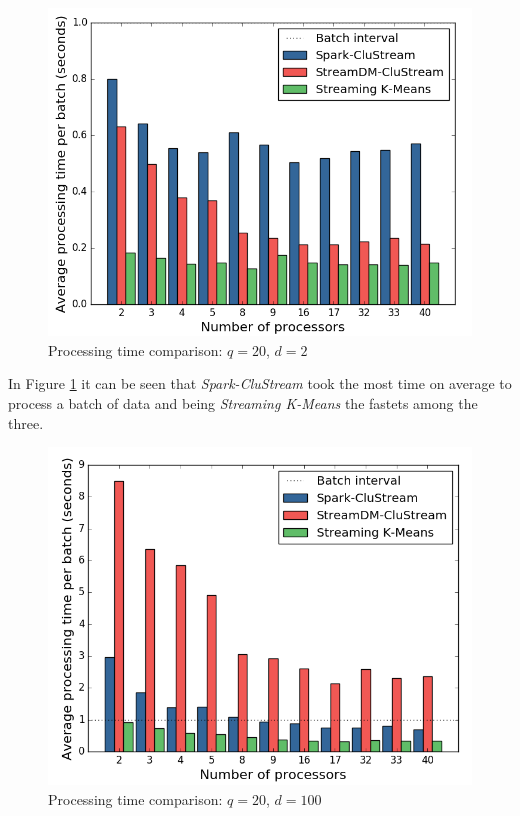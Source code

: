\documentclass{llncs}
\begin{document}
\begin{figure}[h!]
 \centering
 \includegraphics[scale=0.47]{./styles/perfComp2.png}
 \caption{Processing time comparison: $q=20$, $d=2$}
 \label{fig:perfComp2}
\end{figure}

In Figure \ref{fig:perfComp2} it can be seen that \textit{Spark-CluStream} took the most time on average to process a batch of data and being \textit{Streaming K-Means} the fastets among the three. 

\begin{figure}[h!]
 \centering
 \includegraphics[scale=0.47]{./styles/perfComp100.png}
 \caption{Processing time comparison: $q=20$, $d=100$}
 \label{fig:perfComp100}
\end{figure}
\end{document}
